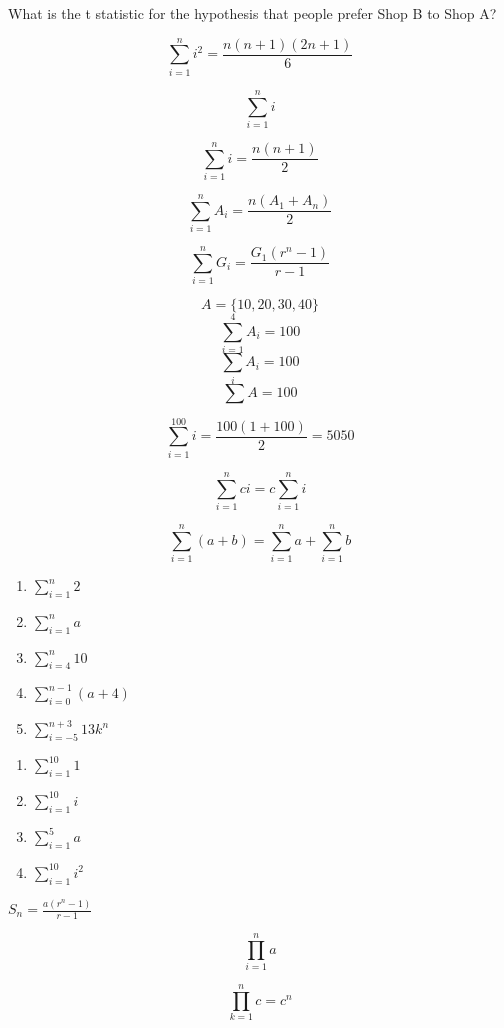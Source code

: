 \documentclass[twocolumn]{article}
\begin{document}
What is the t statistic for the hypothesis that people prefer Shop B to Shop A?

\iffalse
\clearpage

$$ \sum_{i=1}^{n} i^2 = \frac{n(n+1)(2n + 1)}{6} $$

$$ \sum_{i=1}^{n} i $$

$$ \sum_{i=1}^{n} i = \frac{n(n + 1)}{2} $$

$$ \sum_{i=1}^{n} A_i = \frac{n(A_1 + A_n)}{2} $$

$$ \sum_{i=1}^{n} G_i = \frac{G_1(r^n - 1)}{r -1} $$


$$ A = \{ 10, 20, 30, 40 \}$$
$$ \sum_{i=1}^{4} A_i = 100$$
$$ \sum_i A_i = 100$$
$$ \sum A = 100$$

$$ \sum_{i=1}^{100} i = \frac{100(1 + 100)}{2} = 5050$$






$$ \sum_{i=1}^{n} ci = c \sum_{i=1}^{n} i $$

$$ \sum_{i=1}^{n} (a + b) = \sum_{i=1}^{n} a + \sum_{i=1}^{n} b $$

\begin{enumerate}
    \item $ \sum_{i=1}^{n} 2 $

    \item $ \sum_{i=1}^{n} a $

    \item $ \sum_{i=4}^{n} 10 $

    \item $ \sum_{i=0}^{n-1} (a + 4) $

    \item $ \sum_{i=-5}^{n+3} 13k^n$
\end{enumerate}

\begin{enumerate}
    \item $ \sum_{i=1}^{10} 1 $

    \item $ \sum_{i=1}^{10} i $

    \item $ \sum_{i=1}^{5} a $

    \item $ \sum_{i=1}^{10} i^2 $
\end{enumerate}




$ S_n = \frac{a(r^n - 1)}{r-1}$

$$ \prod_{i=1}^{n} a $$

$$ \prod_{k=1}^{n} c = c^n $$
\end{document}
